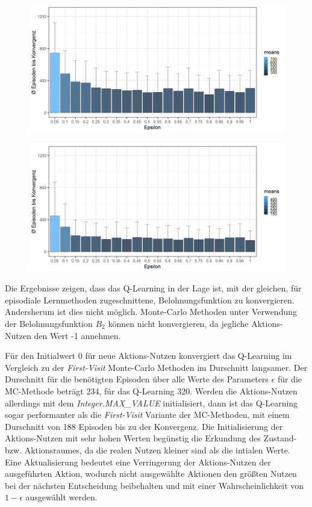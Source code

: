 \begin{figure}[H]
  \centering
  \begin{minipage}{.5\textwidth}
    \centering
    \includegraphics[width=\textwidth]{images/SimpleZ2B1QLearningA}
    \label{fig:test1}
  \end{minipage}%
  \begin{minipage}{.5\textwidth}
    \centering
    \includegraphics[width=\textwidth]{images/SimpleZ2B1QLearningMaxA}
    \label{fig:test2}
  \end{minipage}
\end{figure}
Die Ergebnisse zeigen, dass das Q-Learning in der Lage ist, mit der gleichen, für episodiale Lernmethoden zugeschnittene, Belohnungsfunktion zu konvergieren. Andersherum ist dies nicht möglich. Monte-Carlo Methoden unter Verwendung der Belohnungsfunktion $B_2$ können nicht konvergieren, da jegliche Aktions-Nutzen den Wert -1 annehmen.
\par 
Für den Initialwert 0 für neue Aktions-Nutzen konvergiert das Q-Learning im Vergleich zu der \textit{First-Visit} Monte-Carlo Methoden im Durschnitt langsamer. Der Durschnitt für die benötigten Episoden über alle Werte des Parameters $\epsilon$ für die MC-Methode beträgt 234, für das Q-Learning 320. Werden die Aktions-Nutzen allerdings mit dem \textit{Integer.MAX\_VALUE} initialisiert, dann ist das Q-Learning sogar performanter als die \textit{First-Visit} Variante der MC-Methoden, mit einem Durschnitt von 188 Episoden bis zu der Konvergenz. Die Initialisierung der Aktions-Nutzen mit sehr hohen Werten begünstig die Erkundung des Zustand- bzw. Aktionsraumes, da die realen Nutzen kleiner sind als die intialen Werte. Eine Aktualisierung bedeutet eine Verringerung der Aktions-Nutzen der ausgeführten Aktion, wodurch nicht ausgewählte Aktionen den größten Nutzen bei der nächsten Entscheidung beibehalten und mit einer Wahrscheinlichkeit von $1-\epsilon$ ausgewählt werden.
